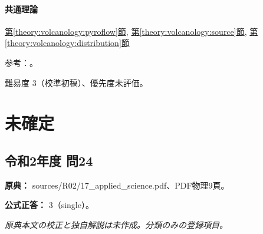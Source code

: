 \paragraph{共通理論} \hyperref[theory:volcanology:pyroflow]{第\ref*{theory:volcanology:pyroflow}節}, \hyperref[theory:volcanology:source]{第\ref*{theory:volcanology:source}節}, \hyperref[theory:volcanology:distribution]{第\ref*{theory:volcanology:distribution}節}

\par 参考：\cite{volc_usgs_merapi,volc_usgs_msh_flow}。

\par 難易度 3（校準初稿）、優先度未評価。

\section{未確定}

\subsection{令和2年度 問24}
\label{q:r02-reg-applied-24}

\noindent\textbf{原典：} sources/R02/17\_applied\_science.pdf、PDF物理9頁。

\textbf{公式正答：} 3（single）。

\par\textit{原典本文の校正と独自解説は未作成。分類のみの登録項目。}
